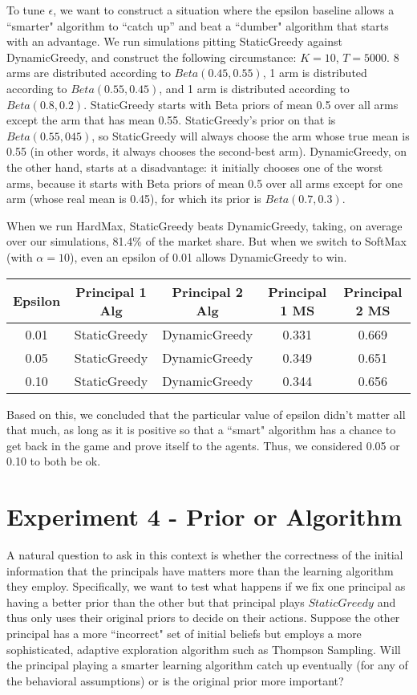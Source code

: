 \documentclass[11pt,letterpaper]{article}
\begin{document}
To tune $\epsilon$, we want to construct a situation where the epsilon baseline allows a ``smarter" algorithm to ``catch up” and beat a ``dumber" algorithm that starts with an advantage. We run simulations pitting StaticGreedy against DynamicGreedy, and construct the following circumstance: $K=10$, $T=5000$. 8 arms are distributed according to $Beta(0.45, 0.55)$, 1 arm is distributed according to $Beta(0.55, 0.45)$, and 1 arm is distributed according to $Beta(0.8, 0.2)$. StaticGreedy starts with Beta priors of mean 0.5 over all arms except the arm that has mean 0.55. StaticGreedy’s prior on that is $Beta(0.55, 045)$, so StaticGreedy will always choose the arm whose true mean is 0.55 (in other words, it always chooses the second-best arm). DynamicGreedy, on the other hand, starts at a disadvantage: it initially chooses one of the worst arms, because it starts with Beta priors of mean 0.5 over all arms except for one arm (whose real mean is 0.45), for which its prior is $Beta(0.7, 0.3)$. 

When we run HardMax, StaticGreedy beats DynamicGreedy, taking, on average over our simulations, 81.4\% of the market share. But when we switch to SoftMax (with $\alpha=10$), even an epsilon of 0.01 allows DynamicGreedy to win.

\begin{center}

 \begin{tabular}{||c c c c c||} 
 \hline
 Epsilon & Principal 1 Alg & Principal 2 Alg & Principal 1 MS & Principal 2 MS \\ [0.5ex] 
 \hline\hline
 0.01 & StaticGreedy & DynamicGreedy & 0.331 & 0.669 \\ 
 \hline
 0.05 & StaticGreedy & DynamicGreedy & 0.349 & 0.651 \\ 
 \hline
 0.10 & StaticGreedy & DynamicGreedy & 0.344 & 0.656 \\ 
 \hline
\end{tabular}
\end{center}

Based on this, we concluded that the particular value of epsilon didn't matter all that much, as long as it is positive so that a ``smart" algorithm has a chance to get back in the game and prove itself to the agents. Thus, we considered 0.05 or 0.10 to both be ok.

\section*{Experiment 4 - Prior or Algorithm}
A natural question to ask in this context is whether the correctness of the initial information that the principals have matters more than the learning algorithm they employ. Specifically, we want to test what happens if we fix one principal as having a better prior than the other but that principal plays $StaticGreedy$ and thus only uses their original priors to decide on their actions.   Suppose the other principal has a more ``incorrect" set of initial beliefs but employs a more sophisticated, adaptive exploration algorithm such as Thompson Sampling. Will the principal playing a smarter learning algorithm catch up eventually (for any of the behavioral assumptions) or is the original prior more important?
\end{document}
